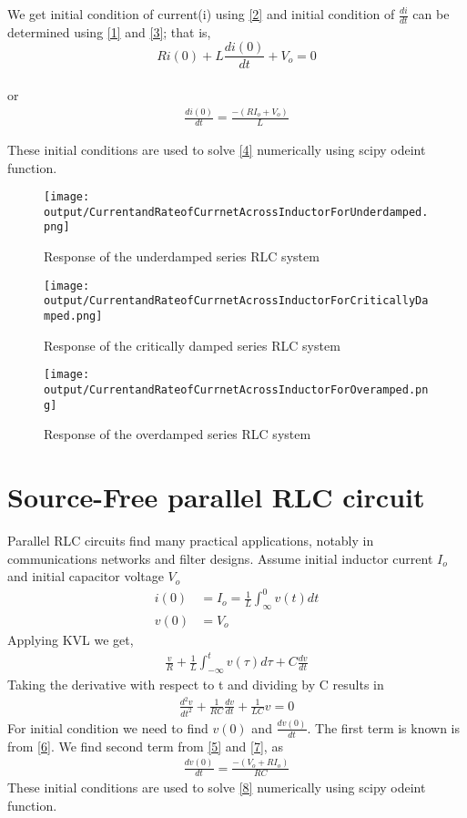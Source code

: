 \documentclass[11pt,a4paper]{article}
\begin{document}
We get initial condition of current(i) using \ref{2} and initial condition of $\frac{di}{dt}$ can be determined using \ref{1} and \ref{3}; that is,\\
$$ Ri(0)+L\frac{di(0)}{dt}+V_o=0 $$ \\or\\
\begin{align}
\frac{di(0)}{dt} = \frac{-(RI_o+V_o)}{L}
\end{align}

These initial conditions are used to solve \ref{4} numerically using scipy odeint function.

\begin{figure}[H]
\texttt{[image: output/CurrentandRateofCurrnetAcrossInductorForUnderdamped.png]}
\caption{Response of the underdamped series RLC system }
\centering
\end{figure}

\begin{figure}[H]
\texttt{[image: output/CurrentandRateofCurrnetAcrossInductorForCriticallyDamped.png]}
\caption{Response of the critically damped series RLC system }
\centering
\end{figure}

\begin{figure}[H]
\texttt{[image: output/CurrentandRateofCurrnetAcrossInductorForOveramped.png]}
\caption{Response of the overdamped series RLC system }
\centering
\end{figure}

\section{Source-Free parallel RLC circuit \cite{Alexander}}
Parallel RLC circuits find many practical applications, notably in communications networks and filter designs.
Assume initial inductor current $I_o$ and initial capacitor voltage $V_o$ 
\begin{align}
i(0) &= I_o = \frac{1}{L}\int_{\infty}^{0}v(t)dt \label{5}\\
v(0) &= V_o \label{6}
\end{align}
Applying KVL we get,
 \begin{align}
 \frac{v}{R} + \frac{1}{L}\int_{-\infty}^tv(\tau)d\tau + C\frac{dv}{dt} \label{7}
 \end{align}
 Taking the derivative with respect to t and dividing by C results in
 \begin{align}
 \frac{d^2v}{dt^2} + \frac{1}{RC}\frac{dv}{dt} + \frac{1}{LC}v =0 \label{8}
 \end{align}
 For initial condition we need to find $v(0)$ and $\frac{dv(0)}{dt}$. The first term is known is from \ref{6}.
 We find second term from \ref{5} and \ref{7}, as
 \begin{align}
 \frac{dv(0)}{dt} = \frac{-(V_o+RI_o)}{RC}
 \end{align}
 These initial conditions are used to solve \ref{8} numerically using scipy odeint function.
 
\end{document}
